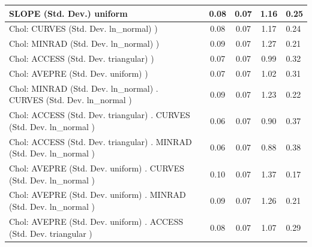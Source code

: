 \begin{table}
\begin{center}
\begin{tabular}{|l|l|c|c|c|l|}
			\hline
			SLOPE (Std. Dev.) uniform &  & 0.08 & 0.07 & 1.16 & 0.25 \\
			\hline
			 Chol: CURVES (Std. Dev. ln_normal) ) &  & 0.08 & 0.07 & 1.17 & 0.24 \\
			\hline
			 Chol: MINRAD (Std. Dev. ln_normal) ) &  & 0.09 & 0.07 & 1.27 & 0.21 \\
			\hline
			 Chol: ACCESS (Std. Dev. triangular) ) &  & 0.07 & 0.07 & 0.99 & 0.32 \\
			\hline
			 Chol: AVEPRE (Std. Dev. uniform) ) &  & 0.07 & 0.07 & 1.02 & 0.31 \\
			\hline
			 Chol: MINRAD (Std. Dev. ln_normal) . CURVES (Std. Dev.   ln_normal ) &  & 0.09 & 0.07 & 1.23 & 0.22 \\
			\hline
			 Chol: ACCESS (Std. Dev. triangular) . CURVES (Std. Dev.   ln_normal ) &  & 0.06 & 0.07 & 0.90 & 0.37 \\
			\hline
			 Chol: ACCESS (Std. Dev. triangular) . MINRAD (Std. Dev.   ln_normal ) &  & 0.06 & 0.07 & 0.88 & 0.38 \\
			\hline
			 Chol: AVEPRE (Std. Dev. uniform) . CURVES (Std. Dev.   ln_normal ) &  & 0.10 & 0.07 & 1.37 & 0.17 \\
			\hline
			 Chol: AVEPRE (Std. Dev. uniform) . MINRAD (Std. Dev.   ln_normal ) &  & 0.09 & 0.07 & 1.26 & 0.21 \\
			\hline
			 Chol: AVEPRE (Std. Dev. uniform) . ACCESS (Std. Dev.   triangular ) &  & 0.08 & 0.07 & 1.07 & 0.29 \\
			\hline
		\end{tabular}
	\end{center}
\end{table}